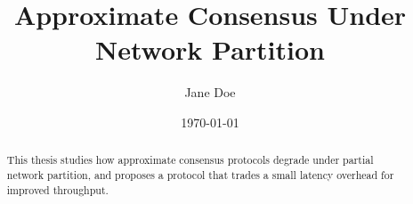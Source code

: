 \documentclass[a4paper,twoside]{suftesi}
\title{Approximate Consensus Under Network Partition}
\author{Jane Doe}
\date{\today}
\begin{document}
\maketitle

\begin{abstract}
This thesis studies how approximate consensus protocols degrade under
partial network partition, and proposes a protocol that trades a
small latency overhead for improved throughput.
\end{abstract}

\tableofcontents






\end{document}
